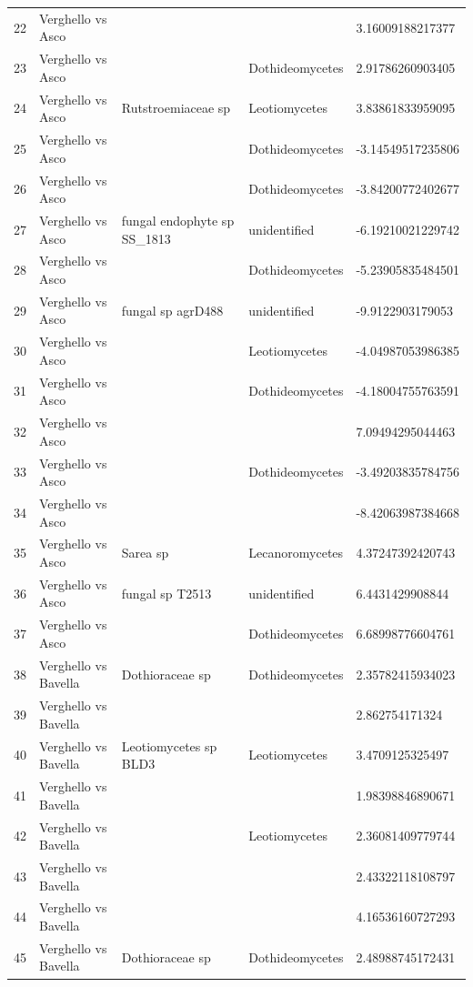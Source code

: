 \documentclass[12pt]{article}\usepackage[]{graphicx}\usepackage[]{color}
\numberwithin{figure}{section}
\begin{document}
\begin{table}[ht]
\begin{tabular}{lllll}
  22 & Verghello vs Asco &  &  & 3.16009188217377 \\ 
  23 & Verghello vs Asco &  & Dothideomycetes & 2.91786260903405 \\ 
  24 & Verghello vs Asco & Rutstroemiaceae sp & Leotiomycetes & 3.83861833959095 \\ 
  25 & Verghello vs Asco &  & Dothideomycetes & -3.14549517235806 \\ 
  26 & Verghello vs Asco &  & Dothideomycetes & -3.84200772402677 \\ 
  27 & Verghello vs Asco & fungal endophyte sp SS\_1813 & unidentified & -6.19210021229742 \\ 
  28 & Verghello vs Asco &  & Dothideomycetes & -5.23905835484501 \\ 
  29 & Verghello vs Asco & fungal sp agrD488 & unidentified & -9.9122903179053 \\ 
  30 & Verghello vs Asco &  & Leotiomycetes & -4.04987053986385 \\ 
  31 & Verghello vs Asco &  & Dothideomycetes & -4.18004755763591 \\ 
  32 & Verghello vs Asco &  &  & 7.09494295044463 \\ 
  33 & Verghello vs Asco &  & Dothideomycetes & -3.49203835784756 \\ 
  34 & Verghello vs Asco &  &  & -8.42063987384668 \\ 
  35 & Verghello vs Asco & Sarea sp & Lecanoromycetes & 4.37247392420743 \\ 
  36 & Verghello vs Asco & fungal sp T2513 & unidentified & 6.4431429908844 \\ 
  37 & Verghello vs Asco &  & Dothideomycetes & 6.68998776604761 \\ 
  38 & Verghello vs Bavella & Dothioraceae sp & Dothideomycetes & 2.35782415934023 \\ 
  39 & Verghello vs Bavella &  &  & 2.862754171324 \\ 
  40 & Verghello vs Bavella & Leotiomycetes sp BLD3 & Leotiomycetes & 3.4709125325497 \\ 
  41 & Verghello vs Bavella &  &  & 1.98398846890671 \\ 
  42 & Verghello vs Bavella &  & Leotiomycetes & 2.36081409779744 \\ 
  43 & Verghello vs Bavella &  &  & 2.43322118108797 \\ 
  44 & Verghello vs Bavella &  &  & 4.16536160727293 \\ 
  45 & Verghello vs Bavella & Dothioraceae sp & Dothideomycetes & 2.48988745172431 \\ 

\end{tabular}
\end{table}
\end{document}
